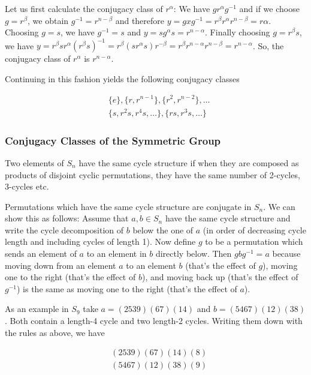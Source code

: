 Let us first calculate the conjugacy class of \(r^\alpha\): We have
\(gr^\alpha g^{-1}\) and if we choose \(g = r^\beta\), we obtain
\(g^{-1} = r^{n-\beta}\) and therefore
\(y = gxg^{-1} = r^\beta r^\alpha r^{n-\beta} = r\alpha\). Choosing
\(g = s\), we have \(g^{-1} = s\) and
\(y = sg^\alpha s = r^{n - \alpha}\). Finally choosing
\(g = r^\beta s\), we have
\(y = r^\beta s r^\alpha (r^\beta s)^{-1} = r^\beta (s r^\alpha s) r^{-\beta} = r^\beta r^{n - \alpha} r^{n-\beta} = r^{n - \alpha}\).
So, the conjugacy class of \(r^\alpha\) is \(r^{n-\alpha}\).

Continuing in this fashion yields the following conjugacy classes


\begin{align*}
& \{e\}, \{r, r^{n-1}\}, \{r^2, r^{n-2}\}, \ldots \\
& \{s, r^2s, r^4s,\ldots\}, \{rs, r^3s, \ldots\}
\end{align*}


\subsubsection{Conjugacy Classes of the Symmetric
Group}\label{conjugacy-classes-of-the-symmetric-group}

Two elements of \(S_n\) have the same cycle structure if when they are
composed as products of disjoint cyclic permutations, they have the same
number of 2-cycles, 3-cycles etc.

Permutations which have the same cycle structure are conjugate in
\(S_n\). We can show this as follows: Assume that \(a,b \in S_n\) have
the same cycle structure and write the cycle decomposition of \(b\)
below the one of \(a\) (in order of decreasing cycle length and
including cycles of length 1). Now define \(g\) to be a permutation
which sends an element of \(a\) to an element in \(b\) directly below.
Then \(gbg^{-1} = a\) because moving down from an element \(a\) to an
element \(b\) (that's the effect of \(g\)), moving one to the right
(that's the effect of \(b\)), and moving back up (that's the effect of
\(g^{-1}\)) is the same as moving one to the right (that's the effect of
\(a\)).

As an example in \(S_9\) take \(a = (2539)(67)(14)\) and
\(b = (5467)(12)(38)\). Both contain a length-4 cycle and two length-2
cycles. Writing them down with the rules as above, we have


\begin{align*}
&(2539)(67)(14)(8) \\
&(5467)(12)(38)(9)
\end{align*}


